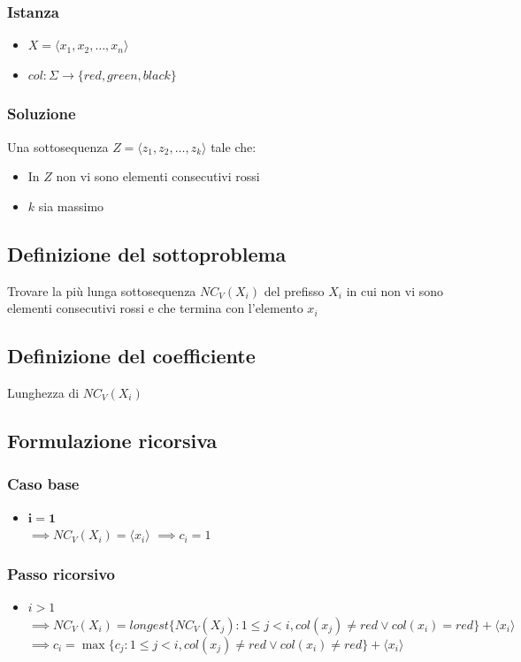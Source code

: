\subsubsection{Istanza}
\begin{itemize}
    \item $X = \langle x_1, x_2, \dots, x_n \rangle$
    \item $col: \Sigma \to \{red, green, black\}$
\end{itemize}

\subsubsection{Soluzione}
Una sottosequenza $Z = \langle z_1, z_2, \dots, z_k \rangle$ tale che:
\begin{itemize}
    \item In $Z$ non vi sono elementi consecutivi rossi
    \item $k$ sia massimo
\end{itemize}

\subsection{Definizione del sottoproblema}
Trovare la più lunga sottosequenza $NC_V(X_i)$ del prefisso $X_i$ in cui non vi sono elementi consecutivi rossi e che termina con l'elemento $x_i$

\subsection{Definizione del coefficiente}
Lunghezza di $NC_V(X_i)$

\subsection{Formulazione ricorsiva}

\subsubsection{Caso base}
\begin{itemize}
    \item $\mathbf{i=1}$ \\
    $\implies NC_V(X_i) = \langle x_i \rangle$
    $\implies c_i = 1$
\end{itemize}

\subsubsection{Passo ricorsivo}
\begin{itemize}
    \item $i>1$\\
    $\implies NC_V(X_i) = longest\{NC_V(X_j): 1 \leq j < i, col(x_j) \not = red \lor col(x_i) = red\} + \langle x_i \rangle $ \\
    $\implies c_i = \max\{c_j : 1 \leq j < i, col(x_j) \not = red \lor col(x_i) \not = red\} + \langle x_i \rangle$
\end{itemize}

